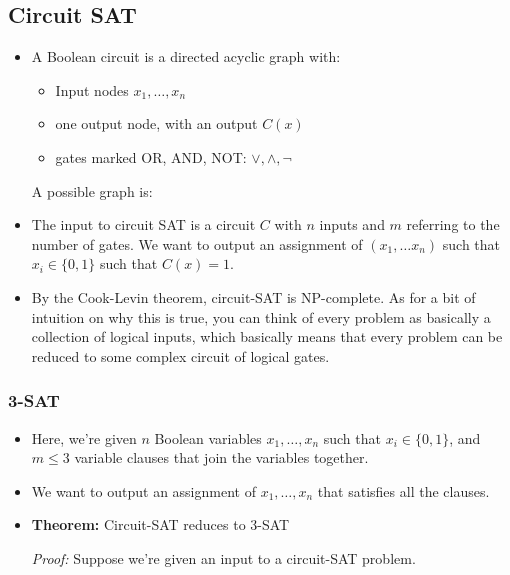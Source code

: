 \subsection{Circuit SAT}
\begin{itemize}
	\item A Boolean circuit is a directed acyclic graph with:
		\begin{itemize}
			\item Input nodes \(x_1, \dots, x_n\) 
			\item one output node, with an output \(C(x)\)
			\item gates marked OR, AND, NOT: \(\lor, \land, \neg\)
		\end{itemize}
		A possible graph is:
		\begin{center}
		\end{center}	
	\item The input to circuit SAT is a circuit \(C\) with \(n\) inputs and \(m\) referring to the number of 
		gates. We want to output an assignment of \((x_1, \dots x_n)\) such that \(x_i \in \{0, 1\}\) 
		such that \(C(x) = 1\).
	\item By the Cook-Levin theorem, circuit-SAT is NP-complete. As for a bit of intuition on why this is true, 
		you can think of every problem as basically a collection of logical inputs, which basically means 
		that every problem can be reduced to some complex circuit of logical gates.  
\end{itemize}
\subsubsection{3-SAT}
\begin{itemize}
	\item Here, we're given \(n\) Boolean variables \( x_1, \dots, x_n\) such that \(x_i \in \{0, 1\} \), and 
		\(m \le  3\) variable clauses that join the variables together. 
	\item We want to output an assignment of \(x_1, \dots, x_n\) that satisfies all the clauses. 
	\item \textbf{Theorem:} Circuit-SAT reduces to 3-SAT

		\textit{Proof:} Suppose we're given an input to a circuit-SAT problem.
\end{itemize}
